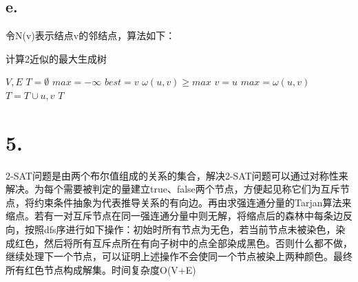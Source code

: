 \documentclass{article}
\begin{document}
	\subsection*{e.}
	\par{令N(v)表示结点v的邻结点，算法如下：}
	\begin{algorithm}
		\caption*{计算2近似的最大生成树}
		\begin{algorithmic}[1]
			 {$V,E$}
			\State	$T=\emptyset$
				\State $max = -\infty$
				\State $best = v$
					\If $\omega(u,v)\ge max$
						\State $v=u$
						\State $max=\omega(u,v)$
					\EndIf
				\EndFor
				\State $T=T\cup{u,v}$
			\EndFor
			\State\Return $T$
			\EndFunction
		\end{algorithmic}
	\end{algorithm}
	\section*{5.}
	\par{2-SAT问题是由两个布尔值组成的关系的集合，解决2-SAT问题可以通过对称性来解决。为每个需要被判定的量建立true、false两个节点，方便起见称它们为互斥节点，将约束条件抽象为代表推导关系的有向边。再由求强连通分量的Tarjan算法来缩点。若有一对互斥节点在同一强连通分量中则无解，将缩点后的森林中每条边反向，按照dfs序进行如下操作：初始时所有节点为无色，若当前节点未被染色，染成红色，然后将所有互斥点所在有向子树中的点全部染成黑色。否则什么都不做，继续处理下一个节点，可以证明上述操作不会使同一个节点被染上两种颜色。最终所有红色节点构成解集。时间复杂度O(V+E)}
\end{document}
